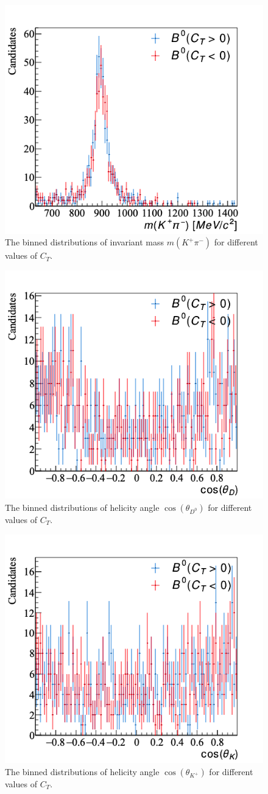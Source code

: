 \begin{figure}[h]
\center
\includegraphics*[width=0.46\linewidth]{CM_variables_B0/invmass_KpPim}
\caption{The binned distributions of invariant mass $m(K^+\pi^-)$ for different values of $C_T$.}
\label{invkpi}
\end{figure}

\begin{figure}[h]
\center
\includegraphics*[width=0.46\linewidth]{CM_variables_B0/helangle_D0Dbar0}
\caption{The binned distributions of helicity angle $\cos(\theta_{D^0})$ for different values of $C_T$.}
\label{thetadd}
\end{figure}

\begin{figure}[h]
\center
\includegraphics*[width=0.46\linewidth]{CM_variables_B0/helangle_KpPim}
\caption{The binned distributions of helicity angle $\cos(\theta_{K^+})$ for different values of $C_T$.}
\label{thetakpi}
\end{figure}

